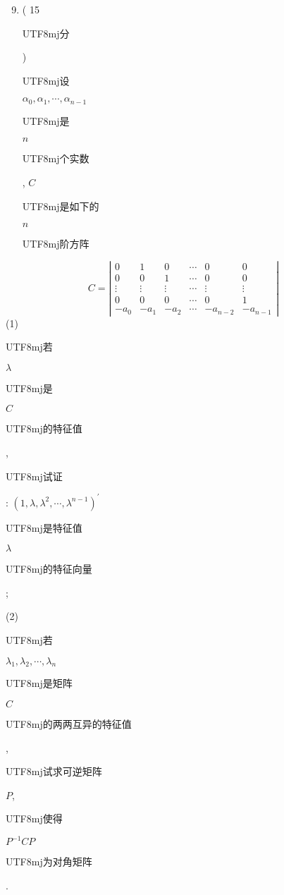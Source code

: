 \documentclass[10pt]{article}
\begin{document}
\begin{enumerate}
  \setcounter{enumi}{8}
  \item ( 15 \begin{CJK}{UTF8}{mj}分\end{CJK}) \begin{CJK}{UTF8}{mj}设\end{CJK} $\alpha_{0}, \alpha_{1}, \cdots, \alpha_{n-1}$ \begin{CJK}{UTF8}{mj}是\end{CJK} $n$ \begin{CJK}{UTF8}{mj}个实数\end{CJK}, $C$ \begin{CJK}{UTF8}{mj}是如下的\end{CJK} $n$ \begin{CJK}{UTF8}{mj}阶方阵\end{CJK}
\end{enumerate}
$$
C=\left|\begin{array}{cccccc}
0 & 1 & 0 & \cdots & 0 & 0 \\
0 & 0 & 1 & \cdots & 0 & 0 \\
\vdots & \vdots & \vdots & \cdots & \vdots & \vdots \\
0 & 0 & 0 & \cdots & 0 & 1 \\
-a_{0} & -a_{1} & -a_{2} & \cdots & -a_{n-2} & -a_{n-1}
\end{array}\right|
$$
(1) \begin{CJK}{UTF8}{mj}若\end{CJK} $\lambda$ \begin{CJK}{UTF8}{mj}是\end{CJK} $C$ \begin{CJK}{UTF8}{mj}的特征值\end{CJK}, \begin{CJK}{UTF8}{mj}试证\end{CJK}: $\left(1, \lambda, \lambda^{2}, \cdots, \lambda^{n-1}\right)^{\prime}$ \begin{CJK}{UTF8}{mj}是特征值\end{CJK} $\lambda$ \begin{CJK}{UTF8}{mj}的特征向量\end{CJK};

(2) \begin{CJK}{UTF8}{mj}若\end{CJK} $\lambda_{1}, \lambda_{2}, \cdots, \lambda_{n}$ \begin{CJK}{UTF8}{mj}是矩阵\end{CJK} $C$ \begin{CJK}{UTF8}{mj}的两两互异的特征值\end{CJK}, \begin{CJK}{UTF8}{mj}试求可逆矩阵\end{CJK} $P$, \begin{CJK}{UTF8}{mj}使得\end{CJK} $P^{-1} C P$ \begin{CJK}{UTF8}{mj}为对角矩阵\end{CJK}.
\end{document}
